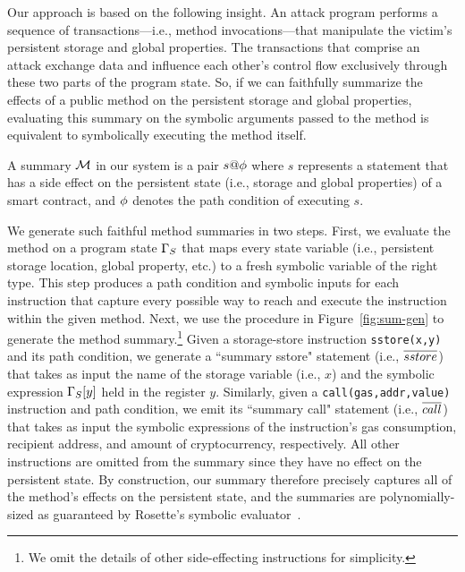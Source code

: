 Our approach is based on the following insight. An attack program performs a
sequence of transactions---i.e., method invocations---that manipulate the
victim's persistent storage and global properties. The transactions that
comprise an attack exchange data and influence each other's control flow
exclusively through these two parts of the program state. So, if we can
faithfully summarize the effects of a public method on the persistent storage
and global properties, evaluating this summary on the symbolic arguments passed
to the method is equivalent to symbolically executing the method
itself.

\begin{definition}
A summary $\mathcal{M}$ in our system is a pair $s@\phi$ where $s$ represents a
statement that has a side effect on the persistent state (i.e., storage and
global properties) of a smart contract, and $\phi$ denotes the path condition of
executing $s$.
\end{definition}

We generate such faithful method summaries in two steps. First, we evaluate the
method on a program state $\Gamma_S$ that maps every state variable (i.e.,
persistent storage location, global property, etc.) to a fresh symbolic variable
of the right type. This step produces a path condition and symbolic inputs for
each instruction that capture every possible way to reach and execute the
instruction within the given method. Next, we use the procedure in
Figure~\ref{fig:sum-gen} to generate the method summary.\footnote{We omit 
the details of other side-effecting instructions for
simplicity.} Given a storage-store instruction \texttt{sstore(x,y)}
and its path condition, we generate a ``summary sstore" statement (i.e.,
${\overline{sstore}}$) that takes as input the name of the storage variable (i.e.,
$x$) and the symbolic expression $\Gamma_S[y]$ held in the register $y$. Similarly,
given a \texttt{call(gas,addr,value)} instruction and path condition, we emit
its ``summary call" statement (i.e., ${\overline{call}}$) that takes as input the
symbolic expressions of the instruction's gas consumption, recipient address,
and amount of cryptocurrency, respectively. All other instructions are omitted
from the summary since they have no effect on the persistent state. By
construction, our summary therefore precisely  captures all of the method's
effects on the persistent state, and the summaries are polynomially-sized as guaranteed by Rosette's symbolic evaluator~\cite{rosette}.

